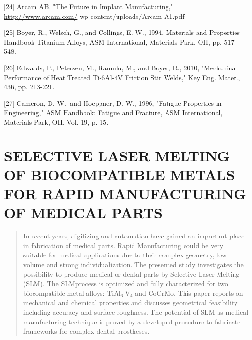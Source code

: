 \documentclass[10pt]{article}
\begin{document}
[24] Arcam AB, "The Future in Implant Manufacturing," \href{http://www.arcam.com/}{http://www.arcam.com/} wp-content/uploads/Arcam-A1.pdf

[25] Boyer, R., Welsch, G., and Collings, E. W., 1994, Materials and Properties Handbook Titanium Alloys, ASM International, Materials Park, OH, pp. 517-548.

[26] Edwards, P., Petersen, M., Ramulu, M., and Boyer, R., 2010, "Mechanical Performance of Heat Treated Ti-6Al-4V Friction Stir Welds," Key Eng. Mater., 436, pp. 213-221.

[27] Cameron, D. W., and Hoeppner, D. W., 1996, "Fatigue Properties in Engineering," ASM Handbook: Fatigue and Fracture, ASM International, Materials Park, OH, Vol. 19, p. 15.

\section*{SELECTIVE LASER MELTING OF BIOCOMPATIBLE METALS FOR RAPID MANUFACTURING OF MEDICAL PARTS }


\begin{abstract}
In recent years, digitizing and automation have gained an important place in fabrication of medical parts. Rapid Manufacturing could be very suitable for medical applications due to their complex geometry, low volume and strong individualization. The presented study investigates the possibility to produce medical or dental parts by Selective Laser Melting (SLM). The SLMprocess is optimized and fully characterized for two biocompatible metal alloys: $\mathrm{TiAl}_{6} \mathrm{~V}_{4}$ and CoCrMo. This paper reports on mechanical and chemical properties and discusses geometrical feasibility including accuracy and surface roughness. The potential of SLM as medical manufacturing technique is proved by a developed procedure to fabricate frameworks for complex dental prostheses.
\end{abstract}
\end{document}
